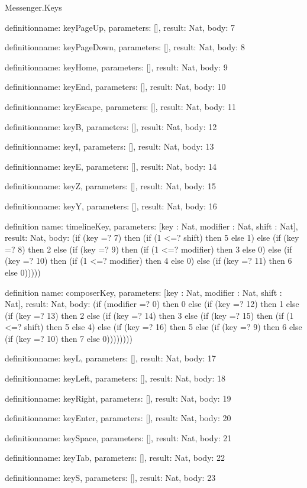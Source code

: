 \begin{lexlean}{Messenger.Keys}
\begin{semanticmodule}
definition{name: keyPageUp, parameters: [], result: Nat, body: 7}

definition{name: keyPageDown, parameters: [], result: Nat, body: 8}

definition{name: keyHome, parameters: [], result: Nat, body: 9}

definition{name: keyEnd, parameters: [], result: Nat, body: 10}

definition{name: keyEscape, parameters: [], result: Nat, body: 11}

definition{name: keyB, parameters: [], result: Nat, body: 12}

definition{name: keyI, parameters: [], result: Nat, body: 13}

definition{name: keyE, parameters: [], result: Nat, body: 14}

definition{name: keyZ, parameters: [], result: Nat, body: 15}

definition{name: keyY, parameters: [], result: Nat, body: 16}

definition{
  name: timelineKey,
  parameters: [key : Nat, modifier : Nat, shift : Nat],
  result: Nat,
  body: (if (key =? 7) then (if (1 <=? shift) then 5 else 1) else (if (key =? 8) then 2 else (if (key =? 9) then (if (1 <=? modifier) then 3 else 0) else (if (key =? 10) then (if (1 <=? modifier) then 4 else 0) else (if (key =? 11) then 6 else 0)))))
}

definition{
  name: composerKey,
  parameters: [key : Nat, modifier : Nat, shift : Nat],
  result: Nat,
  body: (if (modifier =? 0) then 0 else (if (key =? 12) then 1 else (if (key =? 13) then 2 else (if (key =? 14) then 3 else (if (key =? 15) then (if (1 <=? shift) then 5 else 4) else (if (key =? 16) then 5 else (if (key =? 9) then 6 else (if (key =? 10) then 7 else 0))))))))
}

definition{name: keyL, parameters: [], result: Nat, body: 17}

definition{name: keyLeft, parameters: [], result: Nat, body: 18}

definition{name: keyRight, parameters: [], result: Nat, body: 19}

definition{name: keyEnter, parameters: [], result: Nat, body: 20}

definition{name: keySpace, parameters: [], result: Nat, body: 21}

definition{name: keyTab, parameters: [], result: Nat, body: 22}

definition{name: keyS, parameters: [], result: Nat, body: 23}


\end{semanticmodule}
\end{lexlean}
